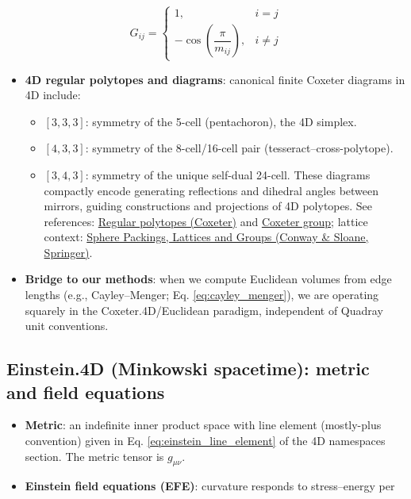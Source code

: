 \documentclass[
]{article}
\providecommand{\tightlist}{%
  \setlength{\itemsep}{0pt}\setlength{\parskip}{0pt}}
\begin{document}
\begin{equation}\label{eq:coxeter_gram}
G_{ij} = \begin{cases}
1, & i=j \\
-\cos\!\left(\dfrac{\pi}{m_{ij}}\right), & i\ne j
\end{cases}
\end{equation}

\begin{itemize}
\tightlist
\item
  \textbf{4D regular polytopes and diagrams}: canonical finite Coxeter
  diagrams in 4D include:

  \begin{itemize}
  \tightlist
  \item
    \([3,3,3]\): symmetry of the 5-cell (pentachoron), the 4D simplex.
  \item
    \([4,3,3]\): symmetry of the 8-cell/16-cell pair
    (tesseract--cross-polytope).
  \item
    \([3,4,3]\): symmetry of the unique self-dual 24-cell. These
    diagrams compactly encode generating reflections and dihedral angles
    between mirrors, guiding constructions and projections of 4D
    polytopes. See references:
    \href{https://en.wikipedia.org/wiki/Regular_polytope}{Regular
    polytopes (Coxeter)} and
    \href{https://en.wikipedia.org/wiki/Coxeter_group}{Coxeter group};
    lattice context:
    \href{https://link.springer.com/book/10.1007/978-1-4757-6568-7}{Sphere
    Packings, Lattices and Groups (Conway \& Sloane, Springer)}.
  \end{itemize}
\item
  \textbf{Bridge to our methods}: when we compute Euclidean volumes from
  edge lengths (e.g., Cayley--Menger; Eq. \eqref{eq:cayley_menger}), we
  are operating squarely in the Coxeter.4D/Euclidean paradigm,
  independent of Quadray unit conventions.
\end{itemize}

\hypertarget{einstein.4d-minkowski-spacetime-metric-and-field-equations}{%
\subsection{Einstein.4D (Minkowski spacetime): metric and field
equations}\label{einstein.4d-minkowski-spacetime-metric-and-field-equations}}

\begin{itemize}
\tightlist
\item
  \textbf{Metric}: an indefinite inner product space with line element
  (mostly-plus convention) given in Eq. \eqref{eq:einstein_line_element}
  of the 4D namespaces section. The metric tensor is \(g_{\mu\nu}\).
\item
  \textbf{Einstein field equations (EFE)}: curvature responds to
  stress--energy per
\end{itemize}
\end{document}
